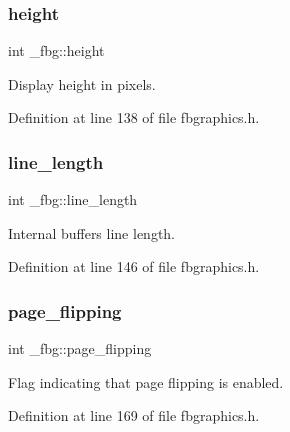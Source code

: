 \mbox{\label{struct__fbg_a3a3bd409e71d020fa77f69a541d832f8}} 
\subsubsection{\texorpdfstring{height}{height}}
{\footnotesize\ttfamily int \+\_\+fbg\+::height}



Display height in pixels. 



Definition at line 138 of file fbgraphics.\+h.

\mbox{\label{struct__fbg_af8a1ee8d7004e6f2193f2a3ed98f8ce8}} 
\subsubsection{\texorpdfstring{line\+\_\+length}{line\_length}}
{\footnotesize\ttfamily int \+\_\+fbg\+::line\+\_\+length}



Internal buffers line length. 



Definition at line 146 of file fbgraphics.\+h.

\mbox{\label{struct__fbg_ad32509bca6ac4fb467476834cb8ce9d2}} 
\subsubsection{\texorpdfstring{page\+\_\+flipping}{page\_flipping}}
{\footnotesize\ttfamily int \+\_\+fbg\+::page\+\_\+flipping}



Flag indicating that page flipping is enabled. 



Definition at line 169 of file fbgraphics.\+h.

\mbox{\label{struct__fbg_a84fb220d4804cba22176997898e75b73}} 
